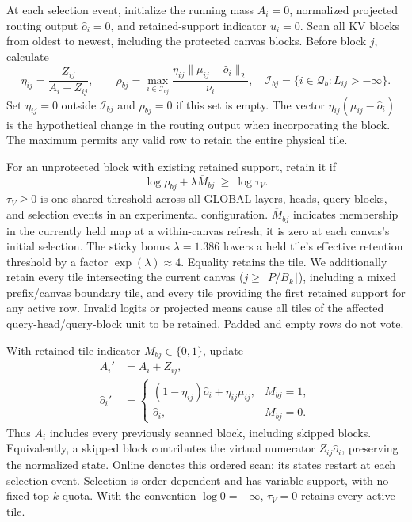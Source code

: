 At each selection event, initialize the running mass $A_i=0$, normalized
projected routing output $\widehat o_i=0$, and retained-support indicator
$u_i=0$. Scan all KV blocks from oldest to newest, including the protected
canvas blocks. Before block $j$, calculate
\begin{equation}
 \eta_{ij}=\frac{Z_{ij}}{A_i+Z_{ij}},
 \qquad
 \rho_{bj}=\max_{i\in\mathcal I_{bj}}
 \frac{\eta_{ij}\|\mu_{ij}-\widehat o_i\|_2}{\nu_i},
 \quad
 \mathcal I_{bj}=\{i\in\mathcal Q_b:L_{ij}>-\infty\}.
 \label{eq:v2-risk}
\end{equation}
Set $\eta_{ij}=0$ outside $\mathcal I_{bj}$ and $\rho_{bj}=0$ if this set
is empty. The vector $\eta_{ij}(\mu_{ij}-\widehat o_i)$ is the hypothetical
change in the routing output when incorporating the block. The maximum
permits any valid row to retain the entire physical tile.

For an unprotected block with existing retained support, retain it if
\begin{equation}
 \log\rho_{bj}+\lambda\overline M_{bj}\ \ge\ \log\tau_V.
 \label{eq:v2-threshold}
\end{equation}
$\tau_V\ge0$ is one shared threshold across all GLOBAL layers, heads,
query blocks, and selection events in an experimental configuration.
$\overline M_{bj}$ indicates membership in the currently held map at a
within-canvas refresh; it is zero at each canvas's initial selection.
The sticky bonus $\lambda=1.386$ lowers a held tile's effective retention
threshold by a factor $\exp(\lambda)\approx4$. Equality retains the tile.
We additionally retain every tile intersecting the current canvas
($j\ge\lfloor P/B_k\rfloor$), including a mixed prefix/canvas boundary
tile, and every tile providing the first retained support for any active
row. Invalid logits or projected means cause all tiles of the affected
query-head/query-block unit to be retained. Padded and empty rows do not vote.

With retained-tile indicator $M_{bj}\in\{0,1\}$, update
\begin{align}
 A_i'&=A_i+Z_{ij}, \label{eq:v2-mass-update}\\
 \widehat o_i'&=
 \begin{cases}
  (1-\eta_{ij})\widehat o_i+\eta_{ij}\mu_{ij}, & M_{bj}=1,\\
  \widehat o_i, & M_{bj}=0.
 \end{cases}
 \label{eq:v2-output-update}
\end{align}
Thus $A_i$ includes every previously scanned block, including skipped
blocks. Equivalently, a skipped block contributes the virtual numerator
$Z_{ij}\widehat o_i$, preserving the normalized state. Online denotes this
ordered scan; its states restart at each selection event. Selection is
order dependent and has variable support, with no fixed top-$k$ quota.
With the convention $\log0=-\infty$, $\tau_V=0$ retains every active tile.

